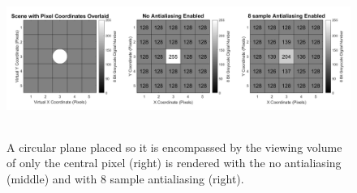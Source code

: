 \begin{figure}[H]
	\centering
	\includegraphics[height = 2in]{../fig/Antialiasing.png}
	\caption{A circular plane placed so it is encompassed by the viewing volume of only the central pixel (right) is rendered with the no antialiasing (middle) and with 8 sample antialiasing (right).  }
	\label{fig:aliasing}
\end{figure}